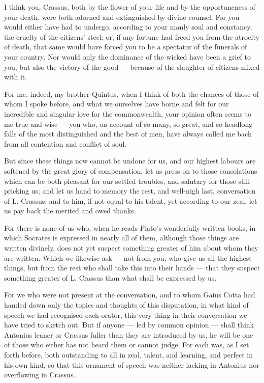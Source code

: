  I think you, Crassus, both by the flower of your life and by the opportuneness of your death, were both adorned and extinguished by divine counsel. For you would either have had to undergo, according to your manly soul and constancy, the cruelty of the citizens' steel; or, if any fortune had freed you from the atrocity of death, that same would have forced you to be a spectator of the funerals of your country. Nor would only the dominance of the wicked have been a grief to you, but also the victory of the good — because of the slaughter of citizens mixed with it.

 For me, indeed, my brother Quintus, when I think of both the chances of those of whom I spoke before, and what we ourselves have borne and felt for our incredible and singular love for the commonwealth, your opinion often seems to me true and wise — you who, on account of so many, so great, and so headlong falls of the most distinguished and the best of men, have always called me back from all contention and conflict of soul.

 But since these things now cannot be undone for us, and our highest labours are softened by the great glory of compensation, let us press on to those consolations which can be both pleasant for our settled troubles, and salutary for those still pricking us; and let us hand to memory the rest, and well-nigh last, conversation of L. Crassus; and to him, if not equal to his talent, yet according to our zeal, let us pay back the merited and owed thanks.

 For there is none of us who, when he reads Plato's wonderfully written books, in which Socrates is expressed in nearly all of them, although those things are written divinely, does not yet suspect something greater of him about whom they are written. Which we likewise ask — not from you, who give us all the highest things, but from the rest who shall take this into their hands — that they suspect something greater of L. Crassus than what shall be expressed by us.

 For we who were not present at the conversation, and to whom Gaius Cotta had handed down only the topics and thoughts of this disputation, in what kind of speech we had recognised each orator, this very thing in their conversation we have tried to sketch out. But if anyone — led by common opinion — shall think Antonius leaner or Crassus fuller than they are introduced by us, he will be one of those who either has not heard them or cannot judge. For each was, as I set forth before, both outstanding to all in zeal, talent, and learning, and perfect in his own kind, so that this ornament of speech was neither lacking in Antonius nor overflowing in Crassus.

